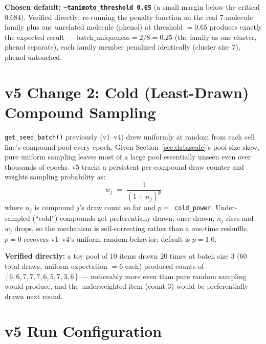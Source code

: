 \documentclass[11pt]{article}
\newcommand{\code}[1]{\texttt{#1}}
\begin{document}
\textbf{Chosen default: \code{--tanimoto\_threshold 0.65}} (a small margin below the critical $0.684$). Verified directly: re-running the penalty function on the real 7-molecule family plus one unrelated molecule (phenol) at threshold $=0.65$ produces exactly the expected result --- $\text{batch\_uniqueness} = 2/8 = 0.25$ (the family as one cluster, phenol separate), each family member penalized identically (cluster size $7$), phenol untouched.

\section{v5 Change 2: Cold (Least-Drawn) Compound Sampling}
\label{sec:cold}

\code{get\_seed\_batch()} previously (v1--v4) drew uniformly at random from each cell line's compound pool every epoch. Given Section~\ref{sec:datascale}'s pool-size skew, pure uniform sampling leaves most of a large pool essentially unseen even over thousands of epochs. v5 tracks a persistent per-compound draw counter and weights sampling probability as:
\[
  \boxed{\; w_j \;=\; \dfrac{1}{\left(1 + n_j\right)^{p}} \;}
\]
where $n_j$ is compound $j$'s draw count so far and $p=$~\code{cold\_power}. Under-sampled (``cold'') compounds get preferentially drawn; once drawn, $n_j$ rises and $w_j$ drops, so the mechanism is self-correcting rather than a one-time reshuffle. $p=0$ recovers v1--v4's uniform random behavior; default is $p=1.0$.

\textbf{Verified directly:} a toy pool of $10$ items drawn $20$ times at batch size $3$ ($60$ total draws, uniform expectation $=6$ each) produced counts of $[6,6,7,7,7,6,5,7,3,6]$ --- noticeably more even than pure random sampling would produce, and the underweighted item (count $3$) would be preferentially drawn next round.

\section{v5 Run Configuration}
\end{document}
